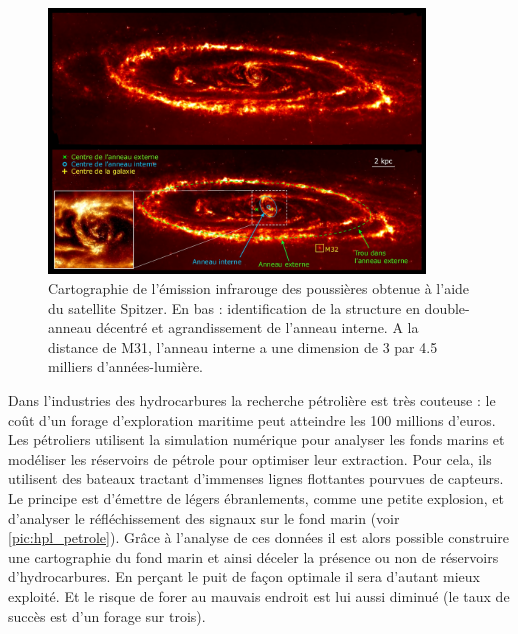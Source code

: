         
        \begin{figure}
            \center
            \includegraphics[width=10cm]{images/cea_galaxy.jpg}
            \caption{\label{pic:cea_galaxy} Cartographie de l'émission infrarouge des poussières  obtenue à l'aide du satellite Spitzer\protect\footnotemark. En bas : identification de la structure en double-anneau décentré et agrandissement de l'anneau interne. A la distance de M31, l'anneau interne a une dimension de 3 par 4.5 milliers d'années-lumière.}
        \end{figure}

    
        Dans l'industries des hydrocarbures la recherche pétrolière est très couteuse : le coût d'un forage d'exploration maritime peut atteindre les 100 millions d'euros.  Les pétroliers utilisent la simulation numérique pour analyser les fonds marins et modéliser les réservoirs de pétrole pour optimiser leur extraction. Pour cela, ils utilisent des bateaux tractant d'immenses lignes flottantes pourvues de capteurs. Le principe est d'émettre de légers ébranlements, comme une petite explosion, et d'analyser le réfléchissement des signaux sur le fond marin (voir \autoref{pic:hpl_petrole}). Grâce à l'analyse de ces données il est alors possible construire une cartographie du fond marin et ainsi déceler la présence ou non de réservoirs d'hydrocarbures.  En perçant le puit de façon optimale il sera d'autant mieux exploité. Et le risque de forer au mauvais endroit est lui aussi diminué (le taux de succès est d'un forage sur trois).

